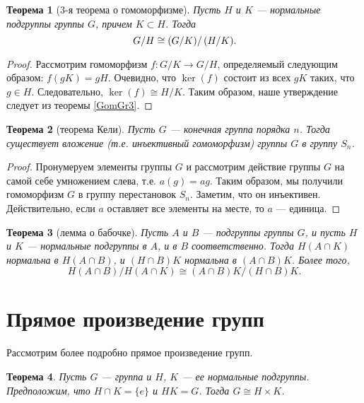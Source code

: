 \documentclass[12pt, titlepage, oneside]{amsbook}
\newtheorem{theorem}{Теорема}[chapter]
\theoremstyle{definition}
\theoremstyle{remark}
\begin{document}
\begin{theorem}[3-я теорема о гомоморфизме]
	\label{GomGr5} Пусть $H$ и $K$ --- нормальные подгруппы группы $G$,
	причем $K\subset H$. Тогда $$\left. G/H\cong (G/K)\right/(H/K).$$
\end{theorem}

\begin{proof}
	Рассмотрим гомоморфизм $f\colon G/K\rightarrow G/H$, определяемый
	следующим образом: $f(gK)=gH$. Очевидно, что $\ker(f)$ состоит из
	всех $gK$ таких, что $g\in H$. Следовательно, $\ker(f)\cong H/K$.
	Таким образом, наше утверждение следует из теоремы \ref{GomGr3}.
\end{proof}

\begin{theorem}[теорема Кели]
	\label{Keli} Пусть $G$ --- конечная группа порядка $n$. Тогда существует вложение (т.е. инъективный гомоморфизм) группы $G$ в группу $S_n$.
\end{theorem}

\begin{proof}
	Пронумеруем элементы группы $G$ и рассмотрим действие группы $G$ на самой себе умножением слева, т.е. $a(g)=ag$. Таким образом, мы получили гомоморфизм $G$ в группу перестановок $S_n$. Заметим, что он инъективен. Действительно, если $a$ оставляет все элементы на месте, то $a$ --- единица.
\end{proof}

\begin{theorem}[лемма о бабочке]
	\label{GomGr6} Пусть $A$ и $B$ --- подгруппы группы $G$, и пусть $H$ и $K$ --- нормальные подгруппы в $A$, и в $B$ соответственно.
	Тогда $H(A\cap K)$ нормальна в $H(A\cap B)$, и $(H\cap B)K$ нормальна в $(A\cap B)K$. Более того, $$H(A\cap B)/H(A\cap K)\cong (A\cap B)K/(H\cap B)K.$$
\end{theorem}

\section{Прямое произведение групп}

Рассмотрим более подробно прямое произведение групп.

\begin{theorem}
	\label{Proizv1} Пусть $G$ --- группа и $H$, $K$ --- ее нормальные подгруппы. Предположим, что $H\cap K=\{e\}$ и $H K=G$. Тогда $G\cong H\times K$.
\end{theorem}
\end{document}
